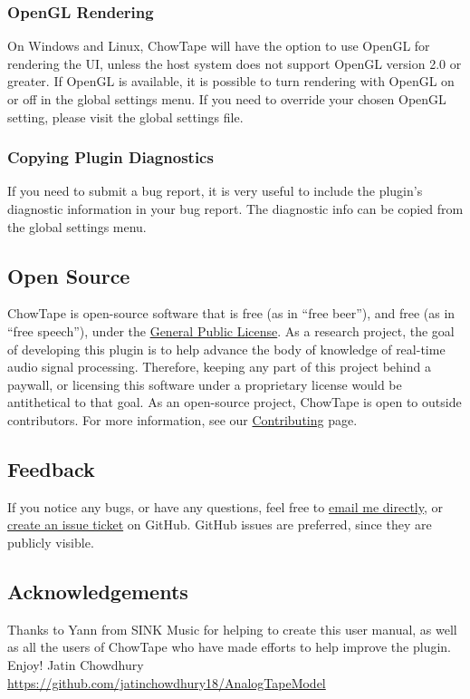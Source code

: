 \documentclass[landscape,twocolumn,a5paper]{manual}
\begin{document}
\subsubsection{OpenGL Rendering}
On Windows and Linux, ChowTape will have the option to use OpenGL
for rendering the UI, unless the host system does not support OpenGL
version 2.0 or greater. If OpenGL is available, it is possible to turn
rendering with OpenGL on or off in the global settings menu. If you
need to override your chosen OpenGL setting, please visit the global
settings file.

\subsubsection{Copying Plugin Diagnostics}
If you need to submit a bug report, it is very useful to include
the plugin's diagnostic information in your bug report. The diagnostic
info can be copied from the global settings menu.

\subsection{Open Source}
ChowTape is open-source software that is free (as in ``free
beer''), and free (as in ``free speech''), under the
\href{https://www.gnu.org/licenses/gpl-3.0}{General Public License}.
As a research project, the goal of developing this plugin is
to help advance the body of knowledge of real-time audio
signal processing. Therefore, keeping any part of this project
behind a paywall, or licensing this software under a proprietary
license would be antithetical to that goal. As an open-source
project, ChowTape is open to outside contributors. For more
information, see our
\href{https://github.com/jatinchowdhury18/AnalogTapeModel/blob/master/CONTRIBUTING.md}{Contributing}
page.

\subsection{Feedback}
If you notice any bugs, or have any questions, feel free
to \href{mailto:chowdsp@gmail.com}{email me directly},
or \href{https://github.com/jatinchowdhury18/AnalogTapeModel/issues}{create an issue ticket}
on GitHub. GitHub issues are preferred, since they are publicly
visible.

\subsection{Acknowledgements}
Thanks to Yann from SINK Music for helping to create this
user manual, as well as all the users of ChowTape who have
made efforts to help improve the plugin.
\newpar
Enjoy!
\newpar
Jatin Chowdhury
\newpar
\href{https://github.com/jatinchowdhury18/AnalogTapeModel}{https://github.com/jatinchowdhury18/AnalogTapeModel}
\end{document}
